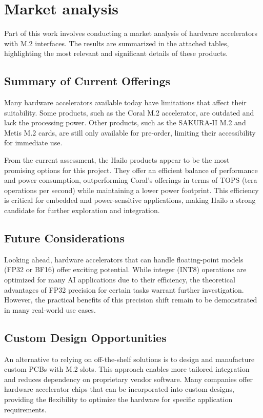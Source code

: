 \chapter{Market analysis}

Part of this work involves conducting a market analysis of hardware accelerators with M.2 interfaces. 
The results are summarized in the attached tables, highlighting the most relevant and significant details of these products.

\section{Summary of Current Offerings}
Many hardware accelerators available today have limitations that affect their suitability.
Some products, such as the Coral M.2 accelerator, are outdated and lack the processing power.
Other products, such as the SAKURA-II M.2 and Metis M.2 cards, are still only available for pre-order, limiting their accessibility for immediate use.

From the current assessment, the Hailo products appear to be the most promising options for this project.
They offer an efficient balance of performance and power consumption, outperforming Coral's offerings in terms of TOPS (tera operations per second) while maintaining a lower power footprint.
This efficiency is critical for embedded and power-sensitive applications, making Hailo a strong candidate for further exploration and integration.

\section{Future Considerations}
Looking ahead, hardware accelerators that can handle floating-point models (FP32 or BF16) offer exciting potential.
While integer (INT8) operations are optimized for many AI applications due to their efficiency, the theoretical advantages of FP32 precision for certain tasks warrant further investigation.
However, the practical benefits of this precision shift remain to be demonstrated in many real-world use cases.


\section{Custom Design Opportunities}
An alternative to relying on off-the-shelf solutions is to design and manufacture custom PCBs with M.2 slots.
This approach enables more tailored integration and reduces dependency on proprietary vendor software.  
Many companies offer hardware accelerator chips that can be incorporated into custom designs, providing the flexibility to optimize the hardware for specific application requirements.


